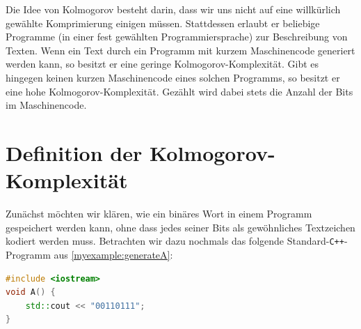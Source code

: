 Die Idee von Kolmogorov besteht darin, dass wir uns nicht auf eine willkürlich gewählte Komprimierung einigen müssen. Stattdessen erlaubt er beliebige Programme (in einer fest gewählten Programmiersprache) zur Beschreibung von Texten. Wenn ein Text durch ein Programm mit kurzem Maschinencode generiert werden kann, so besitzt er eine geringe Kolmogorov-Komplexität. Gibt es hingegen keinen kurzen Maschinencode eines solchen Programms, so besitzt er eine hohe Kolmogorov-Komplexität. Gezählt wird dabei stets die Anzahl der Bits im Maschinencode.

\section{Definition der Kolmogorov-Komplexität}
Zunächst möchten wir klären, wie ein binäres Wort in einem Programm gespeichert werden kann, ohne dass jedes seiner Bits als gewöhnliches Textzeichen kodiert werden muss. Betrachten wir dazu nochmals das folgende Standard-\texttt{C++}-Programm aus \cref{myexample:generateA}:
\begin{lstlisting}[language=C++,escapechar=!] 
#include <iostream>
void A() {
    std::cout << "00110111";
}
\end{lstlisting}

